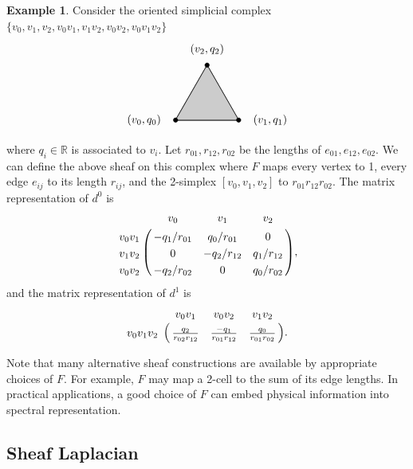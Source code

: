 \documentclass[11pt]{article}
\theoremstyle{definition}
\theoremstyle{definition}
\newtheorem{example}{Example}[section]
\newcommand{\real}{\mathbb R}
\begin{document}
\begin{example} \label{example2.5}
    Consider the oriented simplicial complex $\{v_0,v_1,v_2,v_0v_1,v_1v_2,v_0v_2,v_0v_1v_2\}$
    \[
        \begin{tikzpicture}
            \centering
            \draw[thick] (0,0) -- (2,0) -- (1, 1.732) -- (0,0);
            \draw[fill=black!20!white] (0,0) -- (2,0) -- (1, 1.732) -- (0,0);
            \node at (-1,0) {$(v_0, q_0)$};
            \node at (3,0) {$(v_1, q_1)$};
            \node at (1,2.232) {$(v_2, q_2)$};
            \draw[fill=black] (0,0) circle (2pt);
            \draw[fill=black] (1,1.732) circle (2pt);
            \draw[fill=black] (2,0) circle (2pt);
        \end{tikzpicture}
    \] 
    where $q_i\in \real$ is associated to $v_i$. Let $r_{01}, r_{12}, r_{02}$ be the lengths of $e_{01}, e_{12}, e_{02}$. 
    We can define the above sheaf on this complex where $F$ maps every vertex to 1, every edge $e_{ij}$ to its length $r_{ij}$, 
    and the 2-simplex $[v_0,v_1,v_2]$ to $r_{01}r_{12}r_{02}$. 
    The matrix representation of $d^0$ is
    \begin{align*}
        \bordermatrix{
            ~  &   v_0  & v_1   & v_2  \cr
            v_0v_1 & -q_1/r_{01} & q_0/r_{01} & 0 \cr
            v_1v_2 & 0  & -q_2/r_{12} & q_1/r_{12} \cr
            v_0v_2 & -q_2/r_{02} & 0 & q_0/r_{02} \cr
        },
    \end{align*} 
    and the matrix representation of $d^1$ is 
    \begin{align*}
        \bordermatrix{
            ~               &   v_0v_1  & v_0v_2 & v_1v_2  \cr
            v_0v_1v_2 & \frac{q_2}{r_{02}r_{12}} & \frac{-q_1}{r_{01}r_{12}} & \frac{q_0}{r_{01}r_{02}} \cr
        }.
    \end{align*}    
\end{example}
Note that many alternative sheaf constructions are available by appropriate choices of  $F$. For example, $F$ may map a 2-cell to the sum of its edge lengths. In practical applications, a good choice of $F$ can embed physical information into spectral representation.




\subsection{Sheaf Laplacian}
\end{document}
